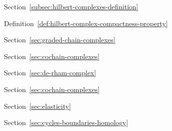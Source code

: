 \par\noindent\hspace*{1em}\label{index:cohomology-reduced}\quad Section~\ref{subsec:hilbert-complexes-definition}

\par\noindent\hspace*{0em}\label{index:compactness-property}\quad Definition~\ref{def:hilbert-complex-compactness-property}

\par\noindent\hspace*{0em}\label{index:complex}

\par\noindent\hspace*{1em}\label{index:complex-chain}\quad Section~\ref{sec:graded-chain-complexes}

\par\noindent\hspace*{1em}\label{index:complex-cochain}\quad Section~\ref{sec:cochain-complexes}

\par\noindent\hspace*{1em}\label{index:complex-de-rham}\quad Section~\ref{sec:de-rham-complex}

\par\noindent\hspace*{1em}\label{index:complex-dual}\quad Section~\ref{sec:cochain-complexes}

\par\noindent\hspace*{1em}\label{index:complex-elasticity}\quad Section~\ref{sec:elasticity}

\par\noindent\hspace*{1em}\label{index:complex-exact}\quad Section~\ref{sec:cycles-boundaries-homology}

